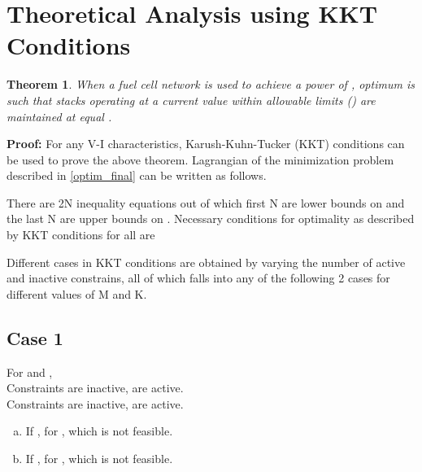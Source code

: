 \documentclass[twocolumn]{autart}
\newtheorem{theorem}{Theorem}
\begin{document}
\section{Theoretical Analysis using KKT Conditions}
\label{genrlsoln}

\begin{theorem}
\label{theorem1}
When a fuel cell network is used to achieve a power of , optimum is such that stacks operating at a current value within allowable limits () are maintained at equal . 
\end{theorem}

\textbf{Proof:} 
For any V-I characteristics, Karush-Kuhn-Tucker (KKT) conditions \cite{kuhn1951proceedings} can be used to prove the above theorem. Lagrangian of the minimization problem described in \eqref{optim_final} can be written as follows.

There are 2N inequality equations out of which first N are lower bounds on  and the last N are upper bounds on . Necessary conditions for optimality as described by KKT conditions for all  are

Different cases in KKT conditions are obtained by varying the number of active and inactive constrains, all of which falls into any of the following 2 cases for different values of M and K. 
\subsection*{Case 1}
For  and , \\
Constraints  are inactive,  are active.\\
Constraints  are inactive,  are active.
\begin{enumerate}[(a)]
\item If , for ,  which is not feasible.
\item If , for ,  which is not feasible.
\end{enumerate}
\end{document}
